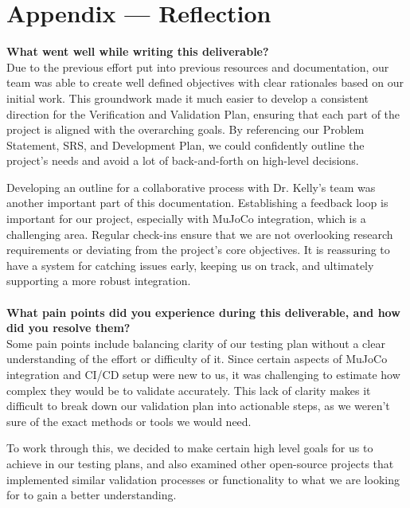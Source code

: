 \documentclass[12pt, titlepage]{article}
\begin{document}
\newpage{}
\section*{Appendix --- Reflection}



% 

\textbf{What went well while writing this deliverable?} 
\\
  
Due to the previous effort put into previous resources and documentation, our team was able to create well defined objectives with clear rationales based on our initial work. This groundwork made it much easier to develop a consistent direction for the Verification and Validation Plan, ensuring that each part of the project is aligned with the overarching goals. By referencing our Problem Statement, SRS, and Development Plan, we could confidently outline the project’s needs and avoid a lot of back-and-forth on high-level decisions. 

Developing an outline for a collaborative process with Dr. Kelly’s team was another important part of this documentation. Establishing a feedback loop is important for our project, especially with MuJoCo integration, which is a challenging area. Regular check-ins ensure that we are not overlooking research requirements or deviating from the project’s core objectives. It is reassuring to have a system for catching issues early, keeping us on track, and ultimately supporting a more robust integration.
\\\\
\textbf{What pain points did you experience during this deliverable, and how did you resolve them?}\\

Some pain points include balancing clarity of our testing plan without a clear understanding of the effort or difficulty of it. Since certain aspects of MuJoCo integration and CI/CD setup were new to us, it was challenging to estimate how complex they would be to validate accurately. This lack of clarity makes it difficult to break down our validation plan into actionable steps, as we weren’t sure of the exact methods or tools we would need.

To work through this, we decided to make certain high level goals for us to achieve in our testing plans, and also examined other open-source projects that implemented similar validation processes or functionality to what we are looking for to gain a better understanding.
\end{document}

